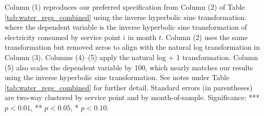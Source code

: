 \begin{table}[t!]
{Column (1) reproduces our preferred specification from Column (2) of Table \ref{tab:water_regs_combined} using the inverse hyperbolic sine transformation.
where the dependent variable is the inverse hyperbolic sine transformation of electricity consumed by service point $i$ in month $t$.
Column (2) uses the same transformation but removed zeros to align with the natural log transformation in Column (3). 
Columns (4)--(5) apply the natural log + 1 transformation. Column (5) also scales the dependent variable by 100, which nearly matches 
our results using the inverse hyperbolic sine transformation. 
See notes under Table \ref{tab:water_regs_combined} for further detail. 
Standard errors (in parentheses) are two-way clustered by service point and by month-of-sample.
Significance: *** $p < 0.01$, ** $p < 0.05$, * $p < 0.10$.
}
\end{table}
